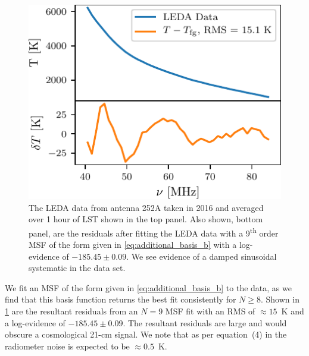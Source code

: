 \begin{figure}
    \centering
    \includegraphics{maxsmooth/figs/Figure12.pdf}
    \caption{The LEDA data from antenna 252A taken in 2016 and averaged over 1 hour of LST shown in the top panel. Also shown, bottom panel, are the residuals after fitting the LEDA data with a 9\textsuperscript{th} order MSF of the form given in \cref{eq:additional_basis_b} with a log-evidence of $-185.45\pm0.09$. We see evidence of a damped sinusoidal systematic in the data set.}
    \label{fig:LEDA_data}
\end{figure}

We fit an MSF of the form given in \cref{eq:additional_basis_b} to the data, as we find that this basis function returns the best fit consistently for $N \geq 8$. Shown in \cref{fig:LEDA_data} are the resultant residuals from an $N = 9$ MSF fit with an RMS of $\approx 15$~K and a log-evidence of $-185.45\pm0.09$. The resultant residuals are large and would obscure a cosmological 21-cm signal. We note that as per equation~(4) in \cite{Price_LEDA_2018} the radiometer noise is expected to be $\approx 0.5$~K.

